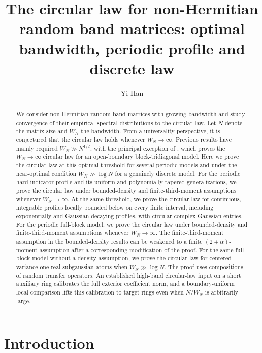 \documentclass[11pt,reqno]{amsart}
\title[Non-Hermitian random band matrices]
{The circular law for non-Hermitian random band matrices: optimal bandwidth, periodic profile and discrete law}
\author{Yi Han}
\numberwithin{equation}{section}
\theoremstyle{definition}
\theoremstyle{remark}
\newcommand{\1}{\mathbf 1}
\begin{document}
\begin{abstract}
We consider non-Hermitian random band matrices with growing bandwidth and
study convergence of their empirical spectral distributions to the circular
law. Let \(N\) denote the matrix size and \(W_N\) the bandwidth. From a
universality perspective, it is conjectured that the circular law holds
whenever \(W_N\to\infty\). Previous results have mainly required
\(W_N\gg N^{1/2}\), with the principal exception of \cite{Han2511}, which
proves the \(W_N\to\infty\) circular law for an open-boundary
block-tridiagonal model. Here we prove the circular law at this optimal
threshold for several periodic models and under the near-optimal condition
\(W_N\gg\log N\) for a genuinely discrete model. For the periodic
hard-indicator profile and its uniform and polynomially tapered
generalizations, we prove the circular law under bounded-density and
finite-third-moment assumptions whenever \(W_N\to\infty\). At the same
threshold, we prove the circular law for
continuous, integrable profiles locally bounded below on every finite
interval, including exponentially and Gaussian decaying profiles, with
circular complex Gaussian entries. For the periodic full-block model, we
prove the circular law under bounded-density and finite-third-moment
assumptions whenever \(W_N\to\infty\). The finite-third-moment assumption in the
bounded-density results can be weakened to a finite
\((2+\alpha)\)-moment assumption after a corresponding modification of the
proof. For the same full-block model without a density assumption, we prove
the circular law for centered variance-one real subgaussian atoms when
\(W_N\gg\log N\). The
proof uses compositions of random transfer operators. An established
high-band circular-law input on a short auxiliary ring calibrates the full
exterior coefficient norm, and a boundary-uniform local comparison lifts
this calibration to target rings even when \(N/W_N\) is arbitrarily large.
\end{abstract}

\maketitle
\tableofcontents

\section{Introduction}
\label{sec:introduction}
\end{document}
